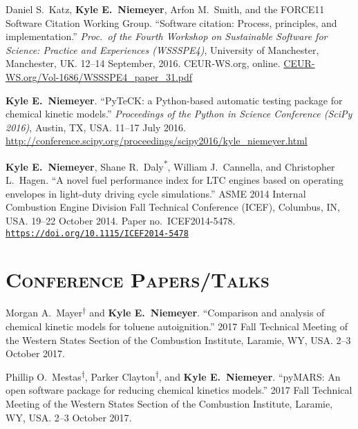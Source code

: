 \documentclass[margin,line,11pt]{res}
\makeatletter
\newlength{\bibhang}
\newlength{\bibsep}
 {\@listi \global\bibsep\itemsep \global\advance\bibsep by\parsep}
\newenvironment{bibenum*}
  {\renewcommand\labelenumi{\theenumi.}%
   \etaremune[
     topsep=0pt,
     itemsep=\bibsep,
     parsep=0pt,partopsep=0pt,
     itemindent=-\bibhang,
     leftmargin={\bibhang+\widthof{[999]}}]}
  {\endetaremune}
\newcommand*{\doi}[1]{\href{https://doi.org/#1}{\nolinkurl{https://doi.org/#1}}}
\newcommand*{\grad}[0]{\textsuperscript{*}}
\newcommand*{\ugrad}[0]{\textsuperscript{$\dagger$}}
\makeatother
\begin{document}
\begin{resume}
\begin{bibenum*}
\item Daniel S.\ Katz, \textbf{Kyle E.~Niemeyer}, Arfon M.\ Smith, and the FORCE11 Software Citation Working Group.
``Software citation: Process, principles, and implementation.''
\emph{Proc.\ of the Fourth Workshop on Sustainable Software for Science: Practice and Experiences (WSSSPE4)},
University of Manchester, Manchester, UK.
12--14 September, 2016.
CEUR-WS.org, online.
\href{http://ceur-ws.org/Vol-1686/WSSSPE4_paper_31.pdf}{CEUR-WS.org/Vol-1686/WSSSPE4\_paper\_31.pdf}

\item \textbf{Kyle E.~Niemeyer}.
``PyTeCK: a Python-based automatic testing package for chemical kinetic models.''
\emph{Proceedings of the  Python in Science Conference (SciPy 2016)},
Austin, TX, USA.
11--17 July 2016.
\url{http://conference.scipy.org/proceedings/scipy2016/kyle_niemeyer.html}

\item \textbf{Kyle E.~Niemeyer}, Shane R.\ Daly\grad{}, William J.\ Cannella, and Christopher L.\ Hagen.
``A novel fuel performance index for LTC engines based on operating envelopes in light-duty driving cycle simulations.''
ASME 2014 Internal Combustion Engine Division Fall Technical Conference (ICEF), Columbus, IN, USA.
19--22 October 2014.
Paper no.~ICEF2014-5478.
\doi{10.1115/ICEF2014-5478}

\end{bibenum*}

\section{\textsc{Conference Papers\slash Talks}}

\begin{bibenum*}

\item Morgan A.~Mayer\ugrad{} and \textbf{Kyle E.~Niemeyer}.
``Comparison and analysis of chemical kinetic models for toluene autoignition.''
2017 Fall Technical Meeting of the Western States Section of the Combustion Institute,
Laramie, WY, USA.
2--3 October 2017.

\item Phillip O.~Mestas\ugrad{}, Parker Clayton\ugrad{}, and \textbf{Kyle E.~Niemeyer}.
``pyMARS: An open software package for reducing chemical kinetics models.''
2017 Fall Technical Meeting of the Western States Section of the Combustion Institute,
Laramie, WY, USA.
2--3 October 2017.


\end{bibenum*}
\end{resume}
\end{document}
